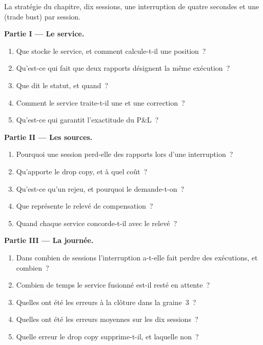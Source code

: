\begin{problem}\label{pb:pl:position-and-pnl-services:1}
La stratégie du chapitre, dix sessions, une interruption de quatre secondes et une  (trade bust) par session.

\medskip\noindent\textbf{Partie I --- Le service.}
\begin{enumerate}
\item Que stocke le service, et comment calcule-t-il une position~?
\item Qu'est-ce qui fait que deux rapports désignent la même exécution~?
\item Que dit le statut, et quand~?
\item Comment le service traite-t-il une  et une correction~?
\item Qu'est-ce qui garantit l'exactitude du P\&L~?
\end{enumerate}

\medskip\noindent\textbf{Partie II --- Les sources.}
\begin{enumerate}[resume]
\item Pourquoi une session perd-elle des rapports lors d'une interruption~?
\item Qu'apporte le drop copy, et à quel coût~?
\item Qu'est-ce qu'un rejeu, et pourquoi le demande-t-on~?
\item Que représente le relevé de compensation~?
\item Quand chaque service concorde-t-il avec le relevé~?
\end{enumerate}

\medskip\noindent\textbf{Partie III --- La journée.}
\begin{enumerate}[resume]
\item Dans combien de sessions l'interruption a-t-elle fait perdre des exécutions, et combien~?
\item Combien de temps le service fusionné est-il resté en attente~?
\item Quelles ont été les erreurs à la clôture dans la graine~3~?
\item Quelles ont été les erreurs moyennes sur les dix sessions~?
\item Quelle erreur le drop copy supprime-t-il, et laquelle non~?
\end{enumerate}


\end{problem}
